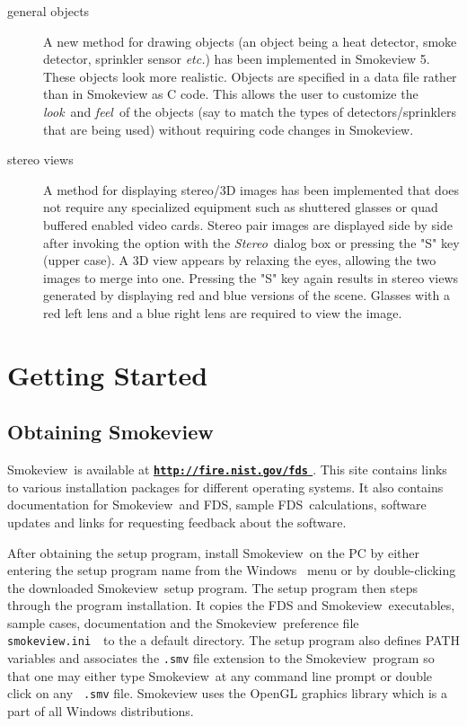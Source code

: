 \documentclass[11pt,twoside]{book}
\newcommand{\svini}{{\tt smokeview.ini}\ }
\newcommand{\hhref}[1]{\href{#1}{{\tt #1}
}}
\newcommand{\fds}{{FDS}}
\newcommand{\Smokeview}{{Smokeview}}
\newcommand{\smokeview}{{Smokeview}}
\begin{document}
\begin{description}
\item[general objects]A new method for drawing objects (an object
being a heat detector, smoke detector, sprinkler sensor {\em
etc.}) has been implemented in Smokeview 5.  These objects look
more realistic.  Objects are specified in a data file rather than
in Smokeview as C code. This allows the user to customize the
{\em look}\ and {\em feel}\ of the objects (say to match the types of
detectors/sprinklers that are being used) without requiring code
changes in Smokeview.

\item[stereo views]A method for displaying stereo/3D images has been implemented that does
not require any specialized equipment such as shuttered glasses or quad buffered enabled video cards.  Stereo pair images are displayed side by side after invoking the option with
the {\em Stereo}\ dialog box or pressing the "S" key (upper case).  A 3D view appears by relaxing the eyes, allowing the two images to merge into one.
Pressing the "S" key again results in stereo views generated by displaying red and blue versions of the scene.  Glasses with a red left lens and a blue right lens are required to view the image.


\end{description}


\chapter{Getting Started}

\section{Obtaining Smokeview}

\Smokeview\ is available at {\bf \hhref{http://fire.nist.gov/fds}}. This site contains links to various installation
packages for different operating systems. It also
contains documentation for \smokeview\ and \fds, sample \fds\ calculations, software updates and links for requesting feedback about the software.

After obtaining the setup program, install \smokeview\  on the PC
by either entering the setup program name from the Windows
\ menu or by double-clicking the downloaded
\smokeview\  setup program. The setup program then steps through
the program installation. It copies the FDS and \smokeview\
executables, sample cases, documentation and the \smokeview\
preference file \svini\ to the a default directory.  The setup program also
defines PATH variables and associates the {\tt .smv} file
extension to the \smokeview\ program so that one may either type
\smokeview\ at any command line prompt or double click on any {\tt
.smv} file. Smokeview uses the OpenGL graphics library which is a
part of all Windows distributions.
\end{document}
